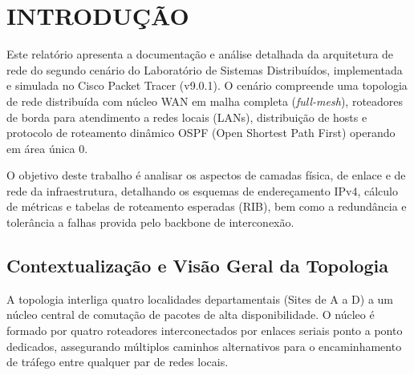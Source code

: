 \section{INTRODUÇÃO}

Este relatório apresenta a documentação e análise detalhada da arquitetura de rede do segundo cenário do Laboratório de Sistemas Distribuídos, implementada e simulada no Cisco Packet Tracer (v9.0.1). O cenário compreende uma topologia de rede distribuída com núcleo WAN em malha completa (\textit{full-mesh}), roteadores de borda para atendimento a redes locais (LANs), distribuição de hosts e protocolo de roteamento dinâmico OSPF (Open Shortest Path First) operando em área única 0.

O objetivo deste trabalho é analisar os aspectos de camadas física, de enlace e de rede da infraestrutura, detalhando os esquemas de endereçamento IPv4, cálculo de métricas e tabelas de roteamento esperadas (RIB), bem como a redundância e tolerância a falhas provida pelo backbone de interconexão.

\subsection{Contextualização e Visão Geral da Topologia}

A topologia interliga quatro localidades departamentais (Sites de A a D) a um núcleo central de comutação de pacotes de alta disponibilidade. O núcleo é formado por quatro roteadores interconectados por enlaces seriais ponto a ponto dedicados, assegurando múltiplos caminhos alternativos para o encaminhamento de tráfego entre qualquer par de redes locais.
